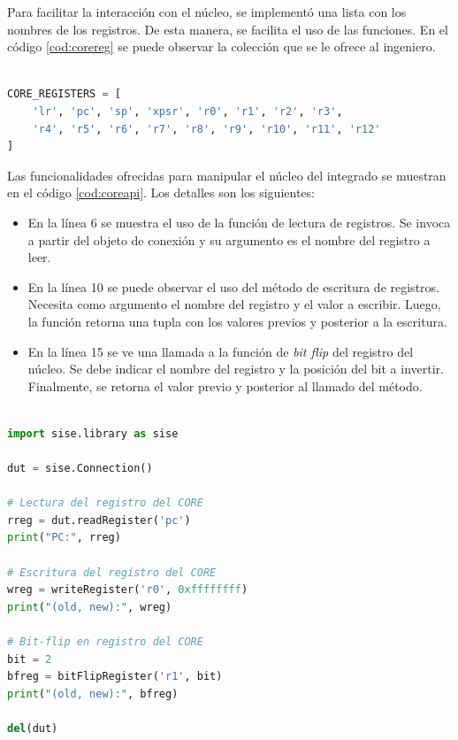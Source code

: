 Para facilitar la interacción con el núcleo, se implementó una lista con los nombres de los registros.
De esta manera, se facilita el uso de las funciones.
En el código \ref{cod:corereg} se puede observar la colección que se le ofrece al ingeniero.

\begin{lstlisting}[language=Python,label=cod:corereg,caption=Lista de registros accesibles por el usuario.]  % Start your code-block

CORE_REGISTERS = [
    'lr', 'pc', 'sp', 'xpsr', 'r0', 'r1', 'r2', 'r3',
    'r4', 'r5', 'r6', 'r7', 'r8', 'r9', 'r10', 'r11', 'r12'
]

\end{lstlisting}

Las funcionalidades ofrecidas para manipular el núcleo del integrado se muestran en el código \ref{cod:coreapi}.
Los detalles son los siguientes:

\begin{itemize}
    \item En la línea 6 se muestra el uso de la función de lectura de registros.
        Se invoca a partir del objeto de conexión y su argumento es el nombre del registro a leer.
    \item En la línea 10 se puede observar el uso del método de escritura de registros.
        Necesita como argumento el nombre del registro y el valor a escribir.
        Luego, la función retorna una tupla con los valores previos y posterior a la escritura.
    \item En la línea 15 se ve una llamada a la función de \emph{bit flip} del registro del núcleo.
        Se debe indicar el nombre del registro y la posición del bit a invertir.
        Finalmente, se retorna el valor previo y posterior al llamado del método.
\end{itemize}


\begin{lstlisting}[language=Python,label=cod:coreapi,caption=Ejemplo de uso en registros del núcleo.]  % Start your code-block

import sise.library as sise

dut = sise.Connection()

# Lectura del registro del CORE
rreg = dut.readRegister('pc')
print("PC:", rreg)

# Escritura del registro del CORE
wreg = writeRegister('r0', 0xffffffff)
print("(old, new):", wreg)

# Bit-flip en registro del CORE
bit = 2
bfreg = bitFlipRegister('r1', bit)
print("(old, new):", bfreg)

del(dut)

\end{lstlisting}

